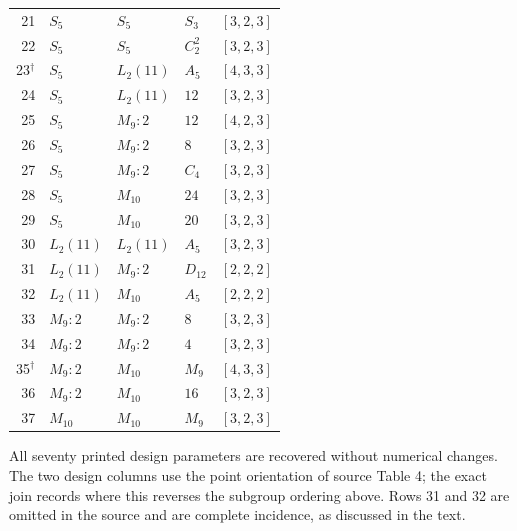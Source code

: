 \begin{center}
\begin{tabular}{rllll}
21 & $S_5$ & $S_5$ & $S_3$ & $[3,2,3]$\\
22 & $S_5$ & $S_5$ & $C_2^2$ & $[3,2,3]$\\
23$^\dagger$ & $S_5$ & $L_2(11)$ & $A_5$ & $[4,3,3]$\\
24 & $S_5$ & $L_2(11)$ & $12$ & $[3,2,3]$\\
25 & $S_5$ & $M_9:2$ & $12$ & $[4,2,3]$\\
26 & $S_5$ & $M_9:2$ & $8$ & $[3,2,3]$\\
27 & $S_5$ & $M_9:2$ & $C_4$ & $[3,2,3]$\\
28 & $S_5$ & $M_{10}$ & $24$ & $[3,2,3]$\\
29 & $S_5$ & $M_{10}$ & $20$ & $[3,2,3]$\\
30 & $L_2(11)$ & $L_2(11)$ & $A_5$ & $[3,2,3]$\\
31 & $L_2(11)$ & $M_9:2$ & $D_{12}$ & $[2,2,2]$\\
32 & $L_2(11)$ & $M_{10}$ & $A_5$ & $[2,2,2]$\\
33 & $M_9:2$ & $M_9:2$ & $8$ & $[3,2,3]$\\
34 & $M_9:2$ & $M_9:2$ & $4$ & $[3,2,3]$\\
35$^\dagger$ & $M_9:2$ & $M_{10}$ & $M_9$ & $[4,3,3]$\\
36 & $M_9:2$ & $M_{10}$ & $16$ & $[3,2,3]$\\
37 & $M_{10}$ & $M_{10}$ & $M_9$ & $[3,2,3]$\\
\bottomrule
\end{tabular}
\end{center}
\clearpage
All seventy printed design parameters are recovered without numerical changes.
The two design columns use the point orientation of source Table 4; the exact
join records where this reverses the subgroup ordering above. Rows 31 and 32
are omitted in the source and are complete incidence, as discussed in the text.

